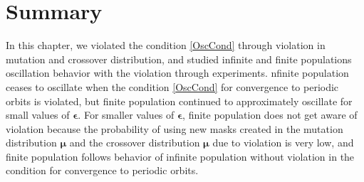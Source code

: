 % 
% 
% 
% 

\section{Summary}
In this chapter, we violated the condition \ref{OscCond} through violation in mutation and crossover distribution, and 
studied infinite and finite populations oscillation behavior with the violation through experiments. 
nfinite population ceases to oscillate when the condition \ref{OscCond} for convergence to 
periodic orbits is violated, but finite population continued to approximately oscillate for small values of $\bm{\epsilon}$. 
For smaller values of $\bm{\epsilon}$, finite population does not get aware of violation because the probability of using 
new masks created in the mutation distribution $\bm{\mu}$ and the crossover distribution $\bm{\mu}$ due to violation is very low, and 
finite population follows behavior of infinite population without violation in the condition for convergence to 
periodic orbits.





 
